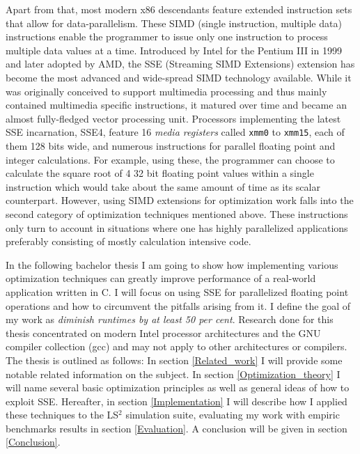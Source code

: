 Apart from that, most modern x86 descendants feature extended instruction sets that allow for data-parallelism. These SIMD (single instruction, multiple data) instructions enable the programmer to issue only one instruction to process multiple data values at a time. Introduced by Intel for the Pentium III in 1999 and later adopted by AMD, the SSE (Streaming SIMD Extensions) extension has become the most advanced and wide-spread SIMD technology available. While it was originally conceived to support multimedia processing and thus mainly contained multimedia specific instructions, it matured over time and became an almost fully-fledged vector processing unit. Processors implementing the latest SSE incarnation, SSE4, feature 16 \emph{media registers} called \texttt{xmm0} to \texttt{xmm15}, each of them 128 bits wide, and numerous instructions for parallel floating point and integer calculations. For example, using these, the programmer can choose to calculate the square root of 4 32 bit floating point values within a single instruction which would take about the same amount of time as its scalar counterpart. However, using SIMD extensions for optimization work falls into the second category of optimization techniques mentioned above. These instructions only turn to account in situations where one has highly parallelized applications preferably consisting of mostly calculation intensive code.

In the following bachelor thesis I am going to show how implementing various optimization techniques can greatly improve performance of a real-world application written in C. I will focus on using SSE for parallelized floating point operations and how to circumvent the pitfalls arising from it. I define the goal of my work as \emph{diminish runtimes by at least 50 per cent}. Research done for this thesis concentrated on modern Intel processor architectures and the GNU compiler collection (gcc) and may not apply to other architectures or compilers. The thesis is outlined as follows: In section \ref{Related_work} I will provide some notable related information on the subject. In section \ref{Optimization_theory} I will name several basic optimization principles as well as general ideas of how to exploit SSE. Hereafter, in section \ref{Implementation} I will describe how I applied these techniques to the LS$^{2}$ simulation suite, evaluating my work with empiric benchmarks results in section \ref{Evaluation}. A conclusion will be given in section \ref{Conclusion}.

